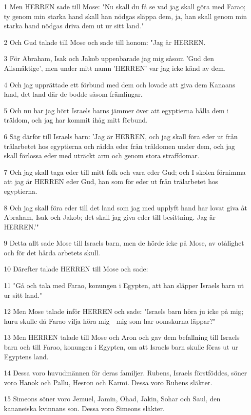 \par 1 Men HERREN sade till Mose: "Nu skall du få se vad jag skall göra med Farao; ty genom min starka hand skall han nödgas släppa dem, ja, han skall genom min starka hand nödgas driva dem ut ur sitt land."
\par 2 Och Gud talade till Mose och sade till honom: "Jag är HERREN.
\par 3 För Abraham, Isak och Jakob uppenbarade jag mig såsom 'Gud den Allsmäktige', men under mitt namn 'HERREN' var jag icke känd av dem.
\par 4 Och jag upprättade ett förbund med dem och lovade att giva dem Kanaans land, det land där de bodde såsom främlingar.
\par 5 Och nu har jag hört Israels barns jämmer över att egyptierna hålla dem i träldom, och jag har kommit ihåg mitt förbund.
\par 6 Säg därför till Israels barn: 'Jag är HERREN, och jag skall föra eder ut från trälarbetet hos egyptierna och rädda eder från träldomen under dem, och jag skall förlossa eder med uträckt arm och genom stora straffdomar.
\par 7 Och jag skall taga eder till mitt folk och vara eder Gud; och I skolen förnimma att jag är HERREN eder Gud, han som för eder ut från trälarbetet hos egyptierna.
\par 8 Och jag skall föra eder till det land som jag med upplyft hand har lovat giva åt Abraham, Isak och Jakob; det skall jag giva eder till besittning. Jag är HERREN.'"
\par 9 Detta allt sade Mose till Israels barn, men de hörde icke på Mose, av otålighet och för det hårda arbetets skull.
\par 10 Därefter talade HERREN till Mose och sade:
\par 11 "Gå och tala med Farao, konungen i Egypten, att han släpper Israels barn ut ur sitt land."
\par 12 Men Mose talade inför HERREN och sade: "Israels barn höra ju icke på mig; huru skulle då Farao vilja höra mig - mig som har oomskurna läppar?"
\par 13 Men HERREN talade till Mose och Aron och gav dem befallning till Israels barn och till Farao, konungen i Egypten, om att Israels barn skulle föras ut ur Egyptens land.
\par 14 Dessa voro huvudmännen för deras familjer. Rubens, Israels förstföddes, söner voro Hanok och Pallu, Hesron och Karmi. Dessa voro Rubens släkter.
\par 15 Simeons söner voro Jemuel, Jamin, Ohad, Jakin, Sohar och Saul, den kananeiska kvinnans son. Dessa voro Simeons släkter.

